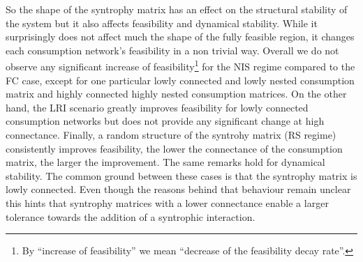 \documentclass[12pt, titlepage]{report}
\begin{document}
So the shape of the syntrophy matrix has an effect on the structural stability of the system but it also affects feasibility and dynamical stability. While it surprisingly does not affect much the shape of the fully feasible region, it changes each consumption network's feasibility in a non trivial way. Overall we do not observe any significant increase of feasibility\footnote{By ``increase of feasibility'' we mean ``decrease of the feasibility decay rate''.} for the NIS regime compared to the FC case, except for one particular lowly connected and lowly nested consumption matrix and highly connected highly nested consumption matrices. On the other hand, the LRI scenario greatly improves feasibility for lowly connected consumption networks but does not provide any significant change at high connectance. Finally, a random structure of the syntrohy matrix (RS regime) consistently improves feasibility, the lower the connectance of the consumption matrix, the larger the improvement. The same remarks hold for dynamical stability. The common ground between these cases is that the syntrophy matrix is lowly connected. Even though the reasons behind that behaviour remain unclear this hints that syntrophy matrices with a lower connectance enable a larger tolerance towards the addition of a syntrophic interaction.

\end{document}
